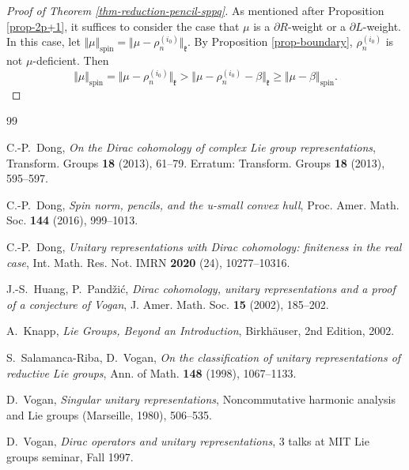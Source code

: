 \documentclass[11pt]{amsart}
\theoremstyle{plain}
\theoremstyle{definition}
\newtheorem{rmk}[thm]{Remark}
\newcommand{\frk}{\mathfrak{k}}
\begin{document}

\begin{proof}[Proof of Theorem \ref{thm-reduction-pencil-sppq}]
As mentioned after Proposition \ref{prop-2p+1},	it suffices to consider the case that $\mu$ is a $\partial R$-weight or a $\partial L$-weight. In this case, let $\Vert\mu\Vert_{\mathrm{spin}}=\Vert\mu-\rho_n^{(i_0)}\Vert_\frk$. By Proposition \ref{prop-boundary}, $\rho_n^{(i_0)}$ is not $\mu$-deficient. Then
	\[\Vert\mu\Vert_{\mathrm{spin}}=\Vert\mu-\rho_n^{(i_0)}\Vert_\frk>\Vert\mu-\rho_n^{(i_0)}-\beta\Vert_\frk\ge\Vert\mu-\beta\Vert_{\mathrm{spin}}.\]
\end{proof}




\medskip




\begin{thebibliography}{99}




 C.-P.~Dong,
\emph{On the Dirac cohomology of complex Lie group representations},
Transform. Groups \textbf{18} (2013), 61--79. Erratum: Transform.
Groups \textbf{18} (2013), 595--597.

  C.-P.~Dong,
\emph{Spin norm, pencils, and the u-small convex hull},
Proc. Amer. Math. Soc. \textbf{144} (2016), 999--1013.

 C.-P.~Dong,
\emph{Unitary representations with Dirac cohomology: finiteness in the real case},
Int. Math. Res. Not. IMRN \textbf{2020} (24), 10277--10316.


 J.-S.~Huang, P.~Pand\v zi\'c, \emph{Dirac
cohomology, unitary representations and a proof of a conjecture of
Vogan}, J. Amer. Math. Soc.  \textbf{15} (2002), 185--202.

 A.~Knapp, \emph{Lie Groups, Beyond an Introduction}, Birkh\"{a}user, 2nd Edition, 2002.

 S.~Salamanca-Riba, D.~Vogan, \emph{On the classification of unitary representations of reductive Lie
groups}, Ann. of Math. \textbf{148} (1998), 1067--1133.


 D.~Vogan,
\emph{Singular unitary representations},  Noncommutative harmonic
analysis and Lie groups (Marseille, 1980),  506--535.

 D.~Vogan, \emph{Dirac operators and unitary
representations}, 3 talks at MIT Lie groups seminar, Fall 1997.

\end{thebibliography}
\end{document}
